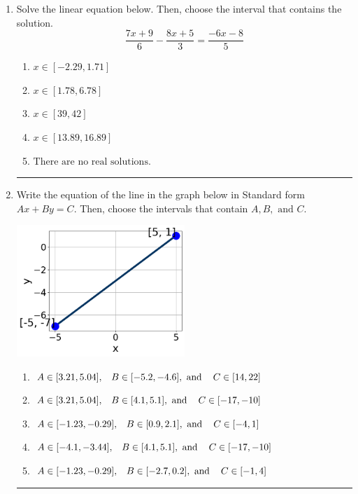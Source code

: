 \documentclass[14pt]{extbook}
\newcommand{\litem}[1]{\item#1\hspace*{-1cm}\rule{\textwidth}{0.4pt}}
\begin{document}
\begin{enumerate}
\litem{
Solve the linear equation below. Then, choose the interval that contains the solution.\[ \frac{7x + 9}{6} - \frac{8x + 5}{3} = \frac{-6x -8}{5} \]\begin{enumerate}[label=\Alph*.]
\item \( x \in [-2.29, 1.71] \)
\item \( x \in [1.78, 6.78] \)
\item \( x \in [39, 42] \)
\item \( x \in [13.89, 16.89] \)
\item \( \text{There are no real solutions.} \)

\end{enumerate} }
\litem{
Write the equation of the line in the graph below in Standard form $Ax+By=C$. Then, choose the intervals that contain $A, B, \text{ and } C$.
\begin{center}
    \includegraphics[width=0.5\textwidth]{../Figures/linearGraphToStandardB.png}
\end{center}
\begin{enumerate}[label=\Alph*.]
\item \( A \in [3.21, 5.04], \hspace{3mm} B \in [-5.2, -4.6], \text{ and } \hspace{3mm} C \in [14, 22] \)
\item \( A \in [3.21, 5.04], \hspace{3mm} B \in [4.1, 5.1], \text{ and } \hspace{3mm} C \in [-17, -10] \)
\item \( A \in [-1.23, -0.29], \hspace{3mm} B \in [0.9, 2.1], \text{ and } \hspace{3mm} C \in [-4, 1] \)
\item \( A \in [-4.1, -3.44], \hspace{3mm} B \in [4.1, 5.1], \text{ and } \hspace{3mm} C \in [-17, -10] \)
\item \( A \in [-1.23, -0.29], \hspace{3mm} B \in [-2.7, 0.2], \text{ and } \hspace{3mm} C \in [-1, 4] \)


\end{enumerate}}
\end{enumerate}
\end{document}
